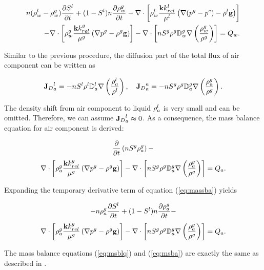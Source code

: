 \begin{align}
\poro (\dens_w^l -\dens_w^g)\pD{S^l}{t} +(1 -S^l)\poro \pD{\dens_w^{g}}{t} -
\nabla \cdot \left[\dens_w^{l}\dfrac{\perm \RelKa^{l}}{\mu^{l}}\left(\nabla (\pres^{g}-\pres^{c}) -\dens^{l} \mathbf g\right)\right]\nonumber\\
-\nabla \cdot \left[\dens_w^{g}\dfrac{\perm \RelKa^{g}}{\mu^{g}}\left(\nabla \pres^{g}-\dens^{g} \mathbf g\right)\right] -
\nabla \cdot \left[\poro \Sat^{g}  \dens^{g} {\mathbb D}_w^{g} \nabla \left(\dfrac{\dens_w^{g}}{\dens^{g}}\right)\right] = Q_w.
\label{eq:msblq}
\end{align}

Similar to the previous procedure, the diffusion part of the total flux of air component can be written as

\begin{align}
{{\FlxDf}_D}_a^{l}=-\poro \Sat^{l}  \dens^{l} {\mathbb D}_a^{l} \nabla \left(\dfrac{\dens_a^{l}}{\dens^{l}}\right),\quad
{{\FlxDf}_D}_a^{a}=-\poro \Sat^{g}  \dens^{g} {\mathbb D}_a^{g} \nabla \left(\dfrac{\dens_a^{g}}{\dens^{g}}\right).
\label{eq:flx_fka}
\end{align}

The density shift from air component to liquid ${\rho_a^{l}}$ is very small and can be omitted. Therefore, we can assume ${{\mathbf{J}}_D}_a^{l}\thickapprox0$. As a consequence, the mass balance equation for air component is derived:

$$\dfrac{\partial }{\partial t} \left(n S^g\rho_a^g\right) -$$
\begin{align}
\nabla \cdot \left[\dens_a^{g}\dfrac{\perm \RelKa^{g}}{\mu^{g}}\left(\nabla \pres^{g}-\dens^{g} \mathbf g\right)\right]-\nabla \cdot \left[\poro \Sat^{g}  \dens^{g} {\mathbb D}_a^{g} \nabla \left(\dfrac{\dens_a^{g}}{\dens^{g}}\right)\right] =Q_a.
\label{eq:massba}
\end{align}

Expanding the temporary derivative term of equation (\ref{eq:massba}) yields

$$-n \rho_a^g \dfrac{\partial S^l}{\partial t} + (1 -S^l)n \dfrac{\partial \rho_a^{g}}{\partial t}-$$
\begin{align}
\nabla \cdot \left[\dens_a^{g}\dfrac{\perm \RelKa^{g}}{\mu^{g}}\left(\nabla \pres^{g}-\dens^{g} \mathbf g\right)\right] -
\nabla \cdot \left[\poro \Sat^{g} \dens^{g} {\mathbb D}_a^{g} \nabla \left(\dfrac{\dens_a^{g}}{\dens^{g}}\right)\right] = Q_a.
\label{eq:msba}
\end{align}

The mass balance equations (\ref{eq:msblq}) and (\ref{eq:msba}) are exactly the same as described in \cite{SanPesSch:06}.

